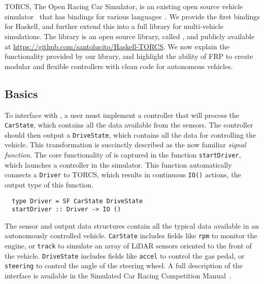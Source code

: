 \section{\ourLib}
TORCS, The Open Racing Car Simulator, is an existing open source vehicle simulator~\cite{torcs} that has bindings for various languages~\cite{SCRC}.
We provide the first bindings for Haskell, and further extend this into a full library for multi-vehicle simulations.
The library is an open source library, called \ourLib, and publicly available at \url{https://github.com/santolucito/Haskell-TORCS}.
We now explain the functionality provided by our library, and highlight the ability of FRP to create modular and flexible controllers with clean code for autonomous vehicles.

\subsection{Basics}

To interface with \ourLib, a user must implement a controller that will process the \texttt{CarState}, which contains all the data available from the sensors.
The controller should then output a \texttt{DriveState}, which contains all the data for controlling the vehicle.
This transformation is succinctly described as the now familiar \textit{signal function}.
The core functionality of \ourLib is captured in the function \texttt{startDriver}, which launches a controller in the simulator.
This function automatically connects a \texttt{Driver} to TORCS, which results in continuous \texttt{IO()} actions, the output type of this function.

\vspace{0.2em}
\begin{lstlisting}
  type Driver = SF CarState DriveState
  startDriver :: Driver -> IO ()
\end{lstlisting}
\vspace{0.2em}

\noindent The sensor and output data structures contain all the typical data available in an autonomously controlled vehicle.
\texttt{CarState} includes fields like \texttt{rpm} to monitor the engine, or \texttt{track} to simulate an array of LiDAR sensors oriented to the front of the vehicle.
\texttt{DriveState} includes fields like \texttt{accel} to control the gas pedal, or \texttt{steering} to control the angle of the steering wheel.
A full description of the interface is available in the Simulated Car Racing Competition Manual~\cite{SCRCManual}. 

